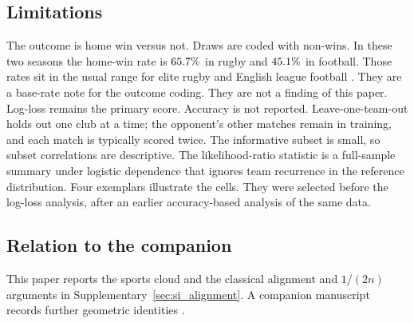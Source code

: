 \subsection{Limitations}

The outcome is home win versus not.
Draws are coded with non-wins.
In these two seasons the home-win rate is $65.7\%$ in rugby and $45.1\%$ in football.
Those rates sit in the usual range for elite rugby and English league football \parencite{morton2006,pollard1986}.
They are a base-rate note for the outcome coding.
They are not a finding of this paper.
Log-loss remains the primary score.
Accuracy is not reported.
Leave-one-team-out holds out one club at a time; the opponent's other matches remain in training, and each match is typically scored twice.
The informative subset is small, so subset correlations are descriptive.
The likelihood-ratio statistic is a full-sample summary under logistic dependence that ignores team recurrence in the reference distribution.
Four exemplars illustrate the cells.
They were selected before the log-loss analysis, after an earlier accuracy-based analysis of the same data.

\subsection{Relation to the companion}

This paper reports the sports cloud and the classical alignment and $1/(2n)$ arguments in Supplementary~\cref{sec:si_alignment}.
A companion manuscript records further geometric identities \parencite{pefstatistics2026}.
